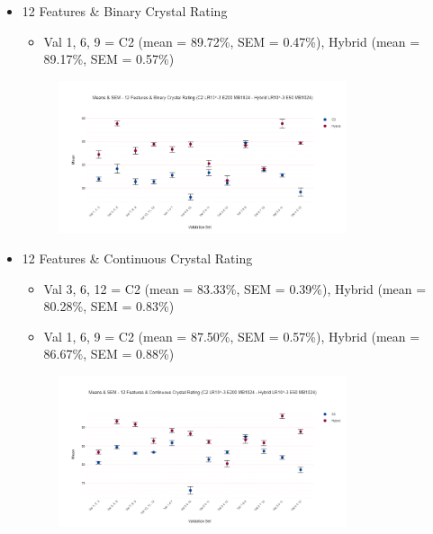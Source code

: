 \begin{itemize}
\begin{figure}[H]
            \end{figure}
        \vspace{0.5cm}
    \item 12 Features \& Binary Crystal Rating 
        \begin{itemize}
        \item Val 1, 6, 9 = C2 (mean = 89.72\%, SEM = 0.47\%), Hybrid (mean = 89.17\%, SEM = 0.57\%)
        \end{itemize}
            \begin{figure}[H]
            \centering
            \includegraphics[width=0.8\textwidth]{images/Means & SEM - 12 Features & Binary Crystal Rating (C2 LR10^-3 E200 MB1024 - Hybrid LR10^-3 E50 MB1024).png}
            \end{figure}
        \vspace{0.5cm}
    \item 12 Features \& Continuous Crystal Rating
        \begin{itemize}
        \item Val 3, 6, 12 = C2 (mean = 83.33\%, SEM = 0.39\%), Hybrid (mean = 80.28\%, SEM = 0.83\%)
        \item Val 1, 6, 9 = C2 (mean = 87.50\%, SEM = 0.57\%), Hybrid (mean = 86.67\%, SEM = 0.88\%)
        \end{itemize}
            \begin{figure}[H]
            \centering
            \includegraphics[width=0.8\textwidth]{images/Means & SEM - 12 Features & Continuous Crystal Rating (C2 LR10^-3 E200 MB1024 - Hybrid LR10^-3 E50 MB1024).png}
            \end{figure}
        \vspace{0.5cm}
\end{itemize}
\vspace{0.5cm}

